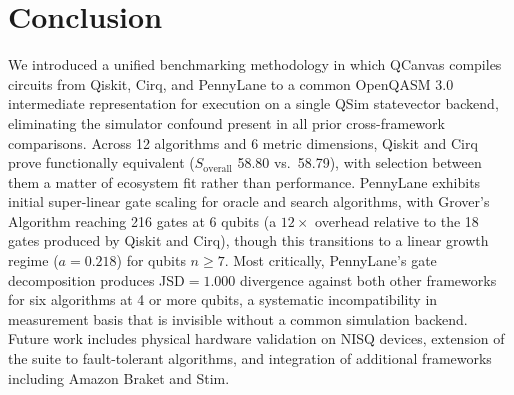 \section{Conclusion}

We introduced a unified benchmarking methodology in which QCanvas
compiles circuits from Qiskit, Cirq, and PennyLane to a common OpenQASM
3.0 intermediate representation for execution on a single QSim
statevector backend, eliminating the simulator confound present in all
prior cross-framework comparisons.
Across 12 algorithms and 6 metric dimensions, Qiskit and Cirq prove
functionally equivalent ($S_{\text{overall}}$ 58.80 vs.\ 58.79), with
selection between them a matter of ecosystem fit rather than performance.
PennyLane exhibits initial super-linear gate scaling for oracle and search
algorithms, with Grover's Algorithm reaching 216 gates at 6 qubits
(a $12\times$ overhead relative to the 18 gates produced by Qiskit and
Cirq), though this transitions to a linear growth regime ($a=0.218$) for
qubits $n \ge 7$.
Most critically, PennyLane's gate decomposition produces JSD$=1.000$
divergence against both other frameworks for six algorithms at 4 or more
qubits, a systematic incompatibility in measurement basis that is
invisible without a common simulation backend.
Future work includes physical hardware validation on NISQ devices,
extension of the suite to fault-tolerant algorithms, and integration of
additional frameworks including Amazon Braket and Stim.
